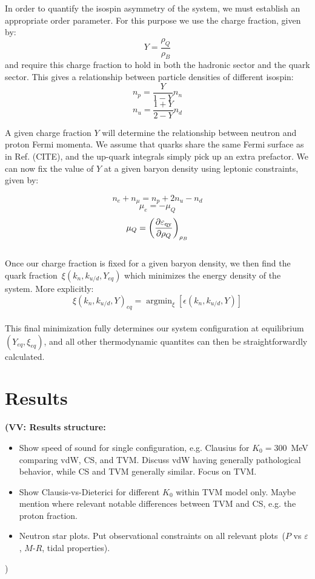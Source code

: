 \documentclass[twocolumn,floatfix,superscriptaddress,a4paper,showkeys,nofootinbib,reprint]{revtex4-1}
\newcommand{\vv}[1]{{\bf  (VV: #1 )}}
\DeclareMathOperator*{\argmin}{arg\min}
\begin{document}
In order to quantify the isospin asymmetry of the system, we must establish an appropriate order parameter. For this purpose we use the charge fraction, given by:
\begin{equation}
    Y = \frac{\rho_Q}{\rho_B}
\end{equation}
and require this charge fraction to hold in both the hadronic sector and the quark sector. This gives a relationship between particle densities of different isospin:
\begin{equation}
    n_p = \frac{Y}{1-Y}n_n
\end{equation}
\begin{equation}
    n_u = \frac{1+Y}{2-Y}n_d
\end{equation}

A given charge fraction $Y$ will determine the relationship between neutron and proton Fermi momenta. We assume that quarks share the same Fermi surface as in Ref. (CITE), and the up-quark integrals simply pick up an extra prefactor. We can now fix the value of $Y$ at a given baryon density using leptonic constraints, given by:

\begin{equation}
    n_e + n_\mu = n_p + 2n_u - n_d
\end{equation}
\begin{equation}
    \mu_e = -\mu_Q
\end{equation}
\begin{equation}
    \mu_Q = \left(\frac{\partial \varepsilon_{\rm qy} }{\partial \rho_Q} \right)_{\rho_B}
\end{equation}
\\
Once our charge fraction is fixed for a given baryon density, we then find the quark fraction~$\xi(k_n,k_{u/d},Y_{eq})$ which minimizes the energy density of the system. More explicitly:
\begin{equation}
    \xi(k_n,k_{u/d},Y)_{eq} = \argmin_{\xi}[\epsilon(k_n,k_{u/d},Y)]
\end{equation}
\\
This final minimization fully determines our system configuration at equilibrium $(Y_{eq},\xi_{eq})$, and all other thermodynamic quantites can then be straightforwardly calculated.
~
~


\section{Results}
\label{sec:results}

\vv{Results structure: 
\begin{itemize}
\item Show speed of sound for single configuration, e.g. Clausius for $K_0 = 300$~MeV comparing vdW, CS, and TVM. Discuss vdW having generally pathological behavior, while CS and TVM generally similar.
Focus on TVM.
\item Show Clausis-vs-Dieterici for different $K_0$ within TVM model only. Maybe mention where relevant notable differences between TVM and CS, e.g. the proton fraction.
\item Neutron star plots. Put observational constraints on all relevant plots~($P$ vs $\varepsilon$, $M$-$R$, tidal properties). 
\end{itemize}
}
\end{document}
